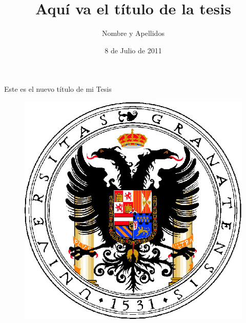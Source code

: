 \documentclass[b5paper,twoside,10pt]{book}
\date{8 de Julio de 2011}
\title{Aquí va el título de la tesis}
\author{Nombre y Apellidos}
\newcommand{\titulo}{Este es el nuevo título de mi Tesis}
\begin{document}


\frontmatter

\renewcommand{\labelitemi}{$\bullet$}
\renewcommand{\labelitemii}{---}
\renewcommand{\labelitemiii}{--}


\pagestyle{empty}
\begin{center}
\LARGE
\titulo
\end{center}



\begin{figure}[h]
\centering
\includegraphics[width=.6\textwidth]{escudo_ugr_portada}
\end{figure}


\end{document}
